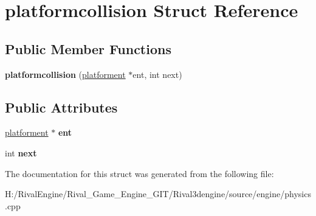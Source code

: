 \hypertarget{structplatformcollision}{}\section{platformcollision Struct Reference}
\label{structplatformcollision}
\subsection*{Public Member Functions}
\begin{DoxyCompactItemize}
\item 
\mbox{\label{structplatformcollision_a483ddd3345596cda89b821e8ef728562}} 
{\bfseries platformcollision} (\hyperlink{structplatforment}{platforment} $\ast$ent, int next)
\end{DoxyCompactItemize}
\subsection*{Public Attributes}
\begin{DoxyCompactItemize}
\item 
\mbox{\label{structplatformcollision_a9d67fba9bed1b3649372ab69f2afc24f}} 
\hyperlink{structplatforment}{platforment} $\ast$ {\bfseries ent}
\item 
\mbox{\label{structplatformcollision_a39c540cdc1e08589ebe90a1b288ceb1a}} 
int {\bfseries next}
\end{DoxyCompactItemize}


The documentation for this struct was generated from the following file\+:\begin{DoxyCompactItemize}
\item 
H\+:/\+Rival\+Engine/\+Rival\+\_\+\+Game\+\_\+\+Engine\+\_\+\+G\+I\+T/\+Rival3dengine/source/engine/physics.\+cpp\end{DoxyCompactItemize}
